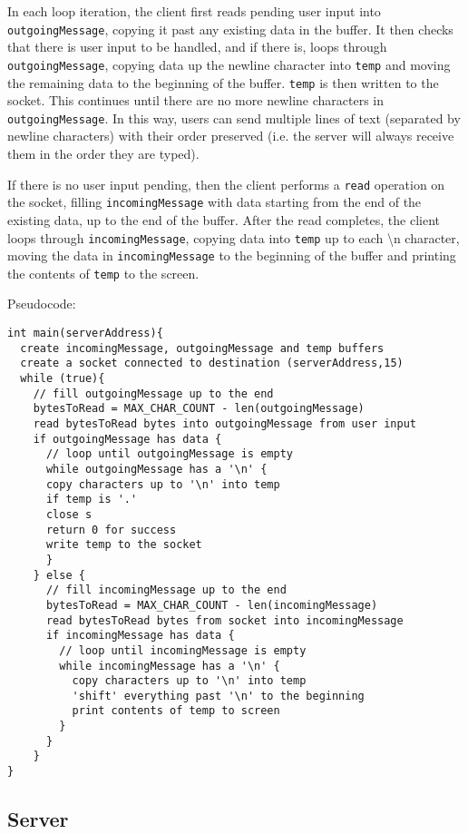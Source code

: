 \documentclass[]{article}
\begin{document}
In each loop iteration, the client first reads pending user input into \\ \texttt{outgoingMessage}, copying it past any existing data in the buffer. It then checks that there is user input to be handled, and if there is, loops through \texttt{outgoingMessage}, copying data up the newline character into \texttt{temp} and moving the remaining data to the beginning of the buffer. \texttt{temp} is then written to the socket. This continues until there are no more newline characters in \texttt{outgoingMessage}. In this way, users can send multiple lines of text (separated by newline characters) with their order preserved (i.e. the server will always receive them in the order they are typed).

If there is no user input pending, then the client performs a \texttt{read} operation on the socket, filling \texttt{incomingMessage} with data starting from the end of the existing data, up to the end of the buffer. After the read completes, the client loops through \texttt{incomingMessage}, copying data into \texttt{temp} up to each \textbackslash n character, moving the data in \texttt{incomingMessage} to the beginning of the buffer and printing the contents of \texttt{temp} to the screen. \\

\pagebreak

\noindent Pseudocode:

\begin{lstlisting}
int main(serverAddress){
  create incomingMessage, outgoingMessage and temp buffers
  create a socket connected to destination (serverAddress,15)
  while (true){
    // fill outgoingMessage up to the end
    bytesToRead = MAX_CHAR_COUNT - len(outgoingMessage)
	read bytesToRead bytes into outgoingMessage from user input
	if outgoingMessage has data {
	  // loop until outgoingMessage is empty
  	  while outgoingMessage has a '\n' {
	  copy characters up to '\n' into temp
	  if temp is '.'
  	  close s
	  return 0 for success
	  write temp to the socket
	  }
	} else {
	  // fill incomingMessage up to the end
	  bytesToRead = MAX_CHAR_COUNT - len(incomingMessage)
	  read bytesToRead bytes from socket into incomingMessage
	  if incomingMessage has data {
	    // loop until incomingMessage is empty
	    while incomingMessage has a '\n' {
	      copy characters up to '\n' into temp
	      'shift' everything past '\n' to the beginning
	      print contents of temp to screen
	    }
	  }
	} 	
}
\end{lstlisting}
\subsection{Server}
\end{document}
